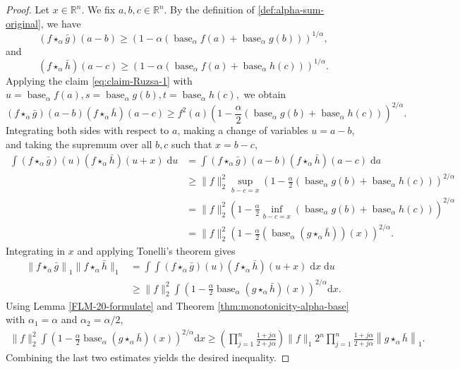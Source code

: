 \documentclass[11pt]{amsart}
\newcommand{\R}{{\mathbb R}}
\theoremstyle{plain}
\theoremstyle{definition}
\theoremstyle{remark}
\begin{document}
\begin{proof}
Let $x \in \R^n$. We fix $a, b, c \in \mathbb{R}^n$. By the definition of \eqref{def:alpha-sum-original}, we have
$$
\left(f \star_\alpha \bar{g}\right)(a-b) \geq\left(1-\alpha\left( \operatorname{ base }_\alpha f(a)+ \operatorname{ base }_\alpha g(b)\right)\right)^{1 / \alpha},
$$
and
$$
    (f \star_\alpha \bar{h})(a-c) \geq\left(1-\alpha\left(\operatorname{ base }_\alpha f(a)+\operatorname{ base }_\alpha h(c)\right)\right)^{1 / \alpha}.
$$
Applying the claim \eqref{eq:claim-Ruzsa-1} with
$
u=\operatorname { base }_\alpha f(a),  s=\operatorname { base }_\alpha g(b),  t=\operatorname { base }_\alpha h(c),
$ we obtain
\[
    \left(f \star_\alpha \bar{g}\right)(a-b)(f \star_\alpha \bar{h})(a-c)
    \geq f^2(a)\left(1-\frac{\alpha}{2}\left(\operatorname{base}_\alpha g(b)+\operatorname{base}_\alpha h(c)\right)\right)^{2 / \alpha} .
\]
Integrating both sides with respect to $a$, making a change of variables $u = a-b$, and taking the supremum over all $b,c$ such that $x = b-c$,
\begin{align}
    \int \left(f \star_\alpha \bar{g}\right) (u) (f \star_\alpha \bar{h})(u+x) \;\mathrm d u
    & =\int \left(f \star_\alpha \bar{g}\right) (a-b) (f \star_\alpha \bar{h})(a-c) \;\mathrm d a
    \\
    &\geq \|f\|_2^2\sup_{b-c = x}\left(1-\frac{\alpha}{2}\left(\operatorname{base}_\alpha g(b)+\operatorname{base}_\alpha h(c)\right)\right)^{2 / \alpha}
    \\
    &=
    \|f\|_2^2\left(1-\frac{\alpha}{2}\inf_{b-c = x} \left(\operatorname{base}_\alpha g(b)+\operatorname{base}_\alpha h(c)\right)\right)^{2 / \alpha}
    \\
    &=
    \|f\|_2^2\left(1-\frac{\alpha}{2}\left(\operatorname{base}_\alpha (g \star_\alpha \bar h )\right)(x)\right)^{2 / \alpha} .
\end{align}
Integrating in $x$ and applying Tonelli's theorem gives
\begin{align}
    \left\|f \star_\alpha \bar{g}\right\|_1\|f \star_\alpha \bar{h}\|_1
    &= \int \int \left(f \star_\alpha \bar{g}\right) (u) (f \star_\alpha \bar{h})(u+x) \;\mathrm d x \;\mathrm d u
    \\
    &\geq \|f\|_2^2 \int \left(1-\frac{\alpha}{2} \operatorname{base}_\alpha\left(g \star_\alpha \bar{h}\right)(x)\right)^{2 / \alpha} \mathrm{d} x.
\end{align}
Using Lemma \ref{FLM-20-formulate} and Theorem \ref{thm:monotonicity-alpha-base} with $\alpha_1=\alpha$ and $\alpha_2=\alpha / 2$,
\begin{align}
    \|f\|_2^2 \int \left(1-\frac{\alpha}{2} \operatorname{base}_\alpha\left(g \star_\alpha \bar{h}\right)(x)\right)^{2 / \alpha} \mathrm{d} x
    \geq
    \left(\prod_{j=1}^n \frac{1+j \alpha}{2+j \alpha} \right) \|f\|_1 2^n \prod_{j=1}^n \frac{1+j \alpha}{2+j \alpha}\left\|g \star_\alpha \bar{h}\right\|_1.
\end{align}
Combining the last two estimates yields the desired inequality.
\end{proof}
\end{document}
